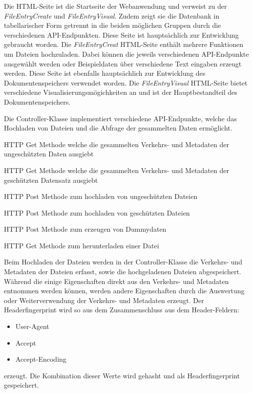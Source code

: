 \documentclass[
    fontsize=12pt,
    headings=small,
    parskip=half,           %
    bibliography=totoc,
    numbers=noenddot,       %
    open=any,               %
    ]{scrreprt}
\begin{document}
Die  HTML-Seite ist die Startseite der Webanwendung und verweist zu der \textit{FileEntryCreate} und \textit{FileEntryVisual}.
Zudem zeigt sie die Datenbank in tabellarischer Form getrennt in die beiden möglichen Gruppen durch die verschiedenen \ac{API}-Endpunkten.
Diese Seite ist hauptsächlich zur Entwicklung gebraucht worden.
Die \textit{FileEntryCreat} HTML-Seite enthält mehrere Funktionen um Dateien hochzuladen.
Dabei können die jeweils verschiedenen \ac{API}-Endpunkte ausgewählt werden oder Beispieldaten über verschiedene Text eingaben erzeugt werden. 
Diese Seite ist ebenfalls hauptsächlich zur Entwicklung des Dokumentenspeichers verwendet worden.
Die \textit{FileEntryVisual} HTML-Seite bietet verschiedene Visualisierungsmögichkeiten an und ist der Hauptbestandteil des Dokumentenspeichers.

Die Controller-Klasse implementiert verschiedene \ac{API}-Endpunkte, welche das Hochladen von Dateien und die Abfrage der gesammelten Daten ermöglicht.
\begin{description}[style=nextline]   
\item[/api/GetA] \ac{HTTP} Get Methode welche die gesammelten Verkehrs- und Metadaten der ungeschützten Daten ausgiebt
\item[/api/GetB] \ac{HTTP} Get Methode welche die gesammelten Verkehrs- und Metadaten der geschützten Datensatz ausgiebt
\item[/api/uploadA] \ac{HTTP} Post Methode zum hochladen von ungeschützten Dateien
\item[/api/uploadB] \ac{HTTP} Post Methode zum hochladen von geschützten Dateien
\item[api/uploadEmu] \ac{HTTP} Post Methode zum erzeugen von Dummydaten
\item[api/getFile] \ac{HTTP} Get Methode zum herunterladen einer Datei
\end{description}

Beim Hochladen der Dateien werden in der Controller-Klasse die Verkehrs- und Metadaten der Dateien erfasst, sowie die hochgeladenen Dateien abgespeichert.
Während die einige Eigenschaften direkt aus den Verkehrs- und Metadaten entnommen werden können, werden andere Eigenschaften durch die Auswertung oder Weiterverwendung  der Verkehrs- und Metadaten erzeugt.
Der Headerfingerprint wird so aus dem Zusammenschluss aus dem Header-Feldern:
\begin{itemize}
\item User-Agent
\item Accept
\item Accept-Encoding
\end{itemize}
erzeugt.
Die Kombination dieser Werte wird gehasht und als Headerfingerprint gespeichert.
\end{document}
